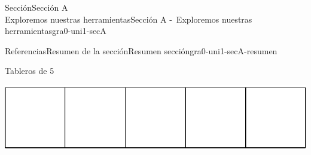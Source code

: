 \begin{sectionptx}{Sección}{{\Large Sección A\\}Exploremos nuestras herramientas}{}{Sección A -~Exploremos nuestras herramientas}{}{}{gra0-uni1-secA}
\begin{references-subsection}{Referencias}{Resumen de la sección}{}{Resumen sección}{}{}{gra0-uni1-secA-resumen}
\begin{sidebyside}{2}{0.05}{0.05}{0.1}
\begin{sbspanel}{0.4}%
Tableros de 5%
\par
\includegraphics[max width=\linewidth, center]{external/svg-source/tikz-file-148144.pdf}
\end{sbspanel}%
\begin{sbspanel}{0.4}%
%
\end{sbspanel}%
\end{sidebyside}%
\end{references-subsection}
\end{sectionptx}
%
%
\typeout{************************************************}
\typeout{************************************************}
%
